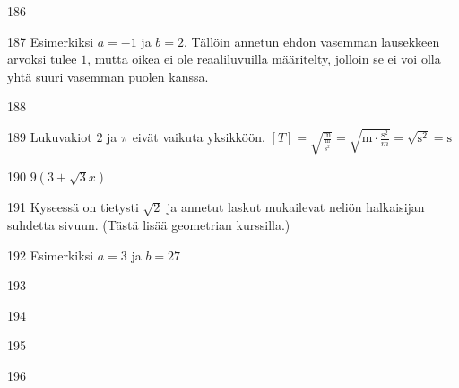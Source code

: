 \begin{Vastaus}{186}
	
\end{Vastaus}
\begin{Vastaus}{187}
Esimerkiksi $a=-1$ ja $b=2$. Tällöin annetun ehdon vasemman lausekkeen arvoksi tulee $1$, mutta oikea ei ole reaaliluvuilla määritelty, jolloin se ei voi olla yhtä suuri vasemman puolen kanssa.
	
\end{Vastaus}
\begin{Vastaus}{188}
	
\end{Vastaus}
\begin{Vastaus}{189}
	Lukuvakiot $2$ ja $\pi$ eivät vaikuta yksikköön. $[T]=\sqrt{\frac{\text{m}}{\frac{\text{m}}{\text{s}^2}}}=\sqrt{\text{m}\cdot \frac{\text{s}^2}{m}}=\sqrt{\text{s}^2}=\text{s}$
	
\end{Vastaus}
\begin{Vastaus}{190}
$9(3 + \sqrt{3}x)$
	
\end{Vastaus}
\begin{Vastaus}{191}
Kyseessä on tietysti $\sqrt{2}$ ja annetut laskut mukailevat neliön halkaisijan suhdetta sivuun. (Tästä lisää geometrian kurssilla.)
	
\end{Vastaus}
\begin{Vastaus}{192}
Esimerkiksi $a=3$ ja $b=27$
	
\end{Vastaus}
\begin{Vastaus}{193}
	
\end{Vastaus}
\begin{Vastaus}{194}
	
\end{Vastaus}
\begin{Vastaus}{195}
	
\end{Vastaus}
\begin{Vastaus}{196}
	
\end{Vastaus}
